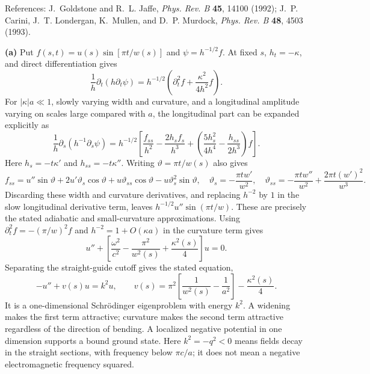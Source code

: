 References: J.~Goldstone and R.~L. Jaffe, \emph{Phys. Rev. B} \textbf{45}, 14100 (1992); J.~P. Carini, J.~T. Londergan, K.~Mullen, and D.~P. Murdock, \emph{Phys. Rev. B} \textbf{48}, 4503 (1993).

\begin{center}
\end{center}
\solution

\medskip\noindent\textbf{(a)} Put $f(s,t)=u(s)\sin[\pi t/w(s)]$ and $\psi=h^{-1/2}f$.
At fixed $s$, $h_t=-\kappa$, and direct differentiation gives
\[
\frac1h\partial_t(h\partial_t\psi)
=h^{-1/2}\left(\partial_t^2f+
 \frac{\kappa^2}{4h^2}f\right).
\]
For $|\kappa|a\ll1$, slowly varying width and curvature, and a
longitudinal amplitude varying on scales large compared with $a$,
the longitudinal part can be expanded explicitly as
\[
\frac1h\partial_s(h^{-1}\partial_s\psi)
=h^{-1/2}\left[\frac{f_{ss}}{h^2}
-\frac{2h_s f_s}{h^3}
+\left(\frac{5h_s^2}{4h^4}-\frac{h_{ss}}{2h^3}\right)f\right].
\]
Here $h_s=-t\kappa'$ and $h_{ss}=-t\kappa''$. Writing
$\vartheta=\pi t/w(s)$ also gives
\[
f_{ss}=u''\sin\vartheta+2u'\vartheta_s\cos\vartheta
+u\vartheta_{ss}\cos\vartheta-u\vartheta_s^2\sin\vartheta,
\quad
\vartheta_s=-\frac{\pi t w'}{w^2},\quad
\vartheta_{ss}=-\frac{\pi t w''}{w^2}
+\frac{2\pi t(w')^2}{w^3}.
\]
Discarding these width and curvature derivatives, and replacing
$h^{-2}$ by $1$ in the slow longitudinal derivative term, leaves
$h^{-1/2}u''\sin(\pi t/w)$. These are precisely the stated
adiabatic and small-curvature approximations.
Using $\partial_t^2f=-(\pi/w)^2f$ and $h^{-2}=1+O(\kappa a)$
in the curvature term gives
\[
u''+\left[\frac{\omega^2}{c^2}-\frac{\pi^2}{w^2(s)}
 +\frac{\kappa^2(s)}4\right]u=0.
\]
Separating the straight-guide cutoff gives the stated equation,
\[
\boxed{-u''+v(s)u=k^2u,\qquad
v(s)=\pi^2\left[\frac1{w^2(s)}-\frac1{a^2}\right]
 -\frac{\kappa^2(s)}4.}
\]
It is a one-dimensional Schr\"odinger eigenproblem with energy
$k^2$.  A widening makes the first term attractive; curvature
makes the second term attractive regardless of the direction of
bending.  A localized negative potential in one dimension supports
a bound ground state.  Here $k^2=-q^2<0$ means fields decay in
the straight sections, with frequency below $\pi c/a$; it does
not mean a negative electromagnetic frequency squared.

